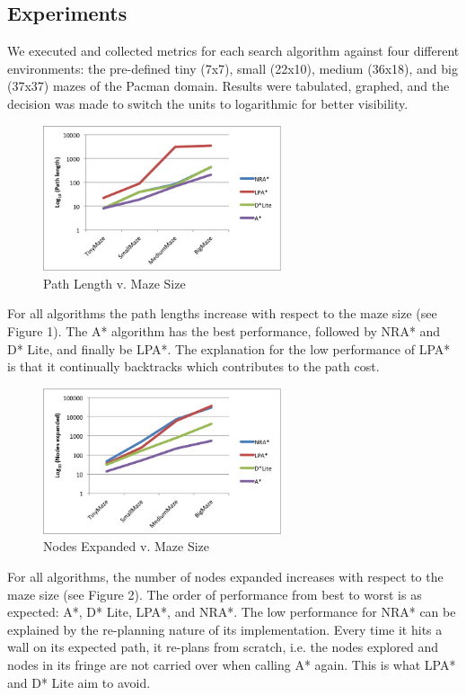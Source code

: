     \subsection{Experiments}
    
    We executed and collected metrics for each search algorithm against four different environments: the pre-defined tiny (7x7), small (22x10), medium (36x18), and big (37x37) mazes of the Pacman domain. Results were tabulated, graphed, and the decision was made to switch the units to logarithmic for better visibility. 
    
    \begin{figure}[htb!]
    	\centering
    	\includegraphics[width=7cm]{PathLength.png}
    	\caption{Path Length v. Maze Size}
    	\label{fig:1}
    \end{figure}

	For all algorithms the path lengths increase with respect to the maze size (see Figure 1). The A* algorithm has the best performance, followed by NRA* and D* Lite, and finally be LPA*. The explanation for the low performance of LPA* is that it continually backtracks which contributes to the path cost. 

	\begin{figure}[htb!]
		\centering
		\includegraphics[width=7cm]{NodesExpanded.png}
		\caption{Nodes Expanded v. Maze Size}
		\label{fig:2}
	\end{figure}

	For all algorithms, the number of nodes expanded increases with respect to the maze size (see Figure 2). The order of performance from best to worst is as expected: A*, D* Lite, LPA*, and NRA*. The low performance for NRA* can be explained by the re-planning nature of its implementation. Every time it hits a wall on its expected path, it re-plans from scratch, i.e. the nodes explored and nodes in its fringe are not carried over when calling A* again. This is what LPA* and D* Lite aim to avoid. 

